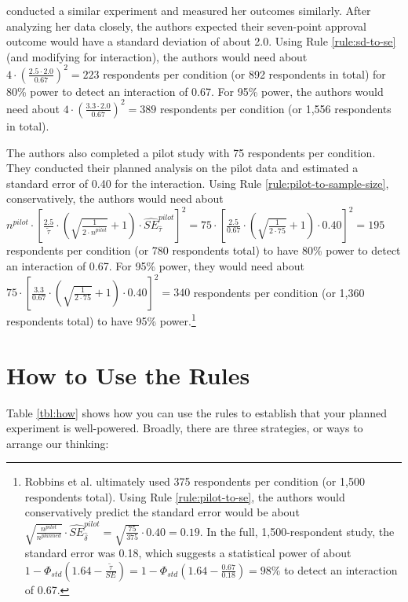 \documentclass[12pt]{article}
\begin{document}
\cite{Myrick2020} conducted a similar experiment and measured her outcomes similarly. After analyzing her data closely, the authors expected their seven-point approval outcome would have a standard deviation of about 2.0. 
Using Rule \ref{rule:sd-to-se} (and modifying for interaction), the authors would need about $4 \cdot \left( \frac{2.5 \cdot 2.0}{0.67} \right)^{2} = 223$ respondents per condition (or 892 respondents in total) for 80\% power to detect an interaction of 0.67. 
For 95\% power, the authors would need about $4 \cdot \left( \frac{3.3 \cdot 2.0}{0.67} \right)^{2} = 389$ respondents per condition (or 1,556 respondents in total).

The authors also completed a pilot study with 75 respondents per condition. 
They conducted their planned analysis on the pilot data and estimated a standard error of 0.40 for the interaction. 
Using Rule \ref{rule:pilot-to-sample-size}, conservatively, the authors would need about $n^{pilot} \cdot \left\lbrack \frac{2.5}{\widetilde{\tau}} \cdot \left( \sqrt{\frac{1}{{2 \cdot n}^{pilot}}} + 1 \right) \cdot {\widehat{SE}}_{\widehat{\tau}}^{pilot} \right\rbrack^{2} = 75 \cdot \left\lbrack \frac{2.5}{0.67} \cdot \left( \sqrt{\frac{1}{2 \cdot 75}} + 1 \right) \cdot 0.40 \right\rbrack^{2} = 195$ respondents per condition (or 780 respondents total) to have 80\% power to detect an interaction of 0.67. 
For 95\% power, they would need about $75 \cdot \left\lbrack \frac{3.3}{0.67} \cdot \left( \sqrt{\frac{1}{2 \cdot 75}} + 1 \right) \cdot 0.40 \right\rbrack^{2} = 340$ respondents per condition (or 1,360 respondents total) to have 95\% power.\footnote{
  Robbins et al. ultimately used 375 respondents per condition (or 1,500 respondents total). 
  Using Rule \ref{rule:pilot-to-se}, the authors would conservatively predict the standard error would be about $\sqrt{\frac{n^{pilot}}{n^{planned}}} \cdot {\widehat{SE}}_{\widehat{\delta}}^{pilot} = \sqrt{\frac{75}{375}} \cdot 0.40 = 0.19$.
  In the full, 1,500-respondent study, the standard error was 0.18, which suggests a statistical power of about $1 - \Phi_{std}\left( 1.64 - \frac{\widetilde{\tau}}{SE} \right) = 1 - \Phi_{std}\left( 1.64 - \frac{0.67}{0.18} \right) = 98\%$ to detect an interaction of 0.67.
  }

\section*{How to Use the Rules}

Table \ref{tbl:how} shows how you can use the rules to establish that your planned experiment is well-powered. Broadly, there are three strategies, or ways to arrange our thinking:
\end{document}
